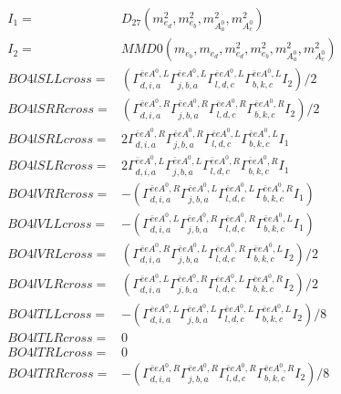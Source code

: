 \documentclass[A4,landscape]{article}
\begin{document}
\begin{align} 
I_1 = & D_{27}(m^2_{e_{{d}}}, m^2_{e_{{b}}}, m^2_{A^0_{{a}}}, m^2_{A^0_{{c}}}) \\ 
I_2 = & MMD0(m_{e_{{b}}}, m_{e_{{d}}}, m^2_{e_{{d}}}, m^2_{e_{{b}}}, m^2_{A^0_{{a}}}, m^2_{A^0_{{c}}}) \\ 
  BO4lSLLcross= & ( \Gamma^{\bar{e}e A^0 ,L}_{d, i, a} \Gamma^{\bar{e}e A^0 ,L}_{j, b, a} \Gamma^{\bar{e}e A^0 ,L}_{l, d, c} \Gamma^{\bar{e}e A^0 ,L}_{b, k, c} I_2)/2 \\ 
  BO4lSRRcross= & ( \Gamma^{\bar{e}e A^0 ,R}_{d, i, a} \Gamma^{\bar{e}e A^0 ,R}_{j, b, a} \Gamma^{\bar{e}e A^0 ,R}_{l, d, c} \Gamma^{\bar{e}e A^0 ,R}_{b, k, c} I_2)/2 \\ 
  BO4lSRLcross= & 2  \Gamma^{\bar{e}e A^0 ,R}_{d, i, a} \Gamma^{\bar{e}e A^0 ,R}_{j, b, a} \Gamma^{\bar{e}e A^0 ,L}_{l, d, c} \Gamma^{\bar{e}e A^0 ,L}_{b, k, c} I_1 \\ 
  BO4lSLRcross= & 2  \Gamma^{\bar{e}e A^0 ,L}_{d, i, a} \Gamma^{\bar{e}e A^0 ,L}_{j, b, a} \Gamma^{\bar{e}e A^0 ,R}_{l, d, c} \Gamma^{\bar{e}e A^0 ,R}_{b, k, c} I_1 \\ 
  BO4lVRRcross= & -( \Gamma^{\bar{e}e A^0 ,R}_{d, i, a} \Gamma^{\bar{e}e A^0 ,L}_{j, b, a} \Gamma^{\bar{e}e A^0 ,L}_{l, d, c} \Gamma^{\bar{e}e A^0 ,R}_{b, k, c} I_1) \\ 
  BO4lVLLcross= & -( \Gamma^{\bar{e}e A^0 ,L}_{d, i, a} \Gamma^{\bar{e}e A^0 ,R}_{j, b, a} \Gamma^{\bar{e}e A^0 ,R}_{l, d, c} \Gamma^{\bar{e}e A^0 ,L}_{b, k, c} I_1) \\ 
  BO4lVRLcross= & ( \Gamma^{\bar{e}e A^0 ,R}_{d, i, a} \Gamma^{\bar{e}e A^0 ,L}_{j, b, a} \Gamma^{\bar{e}e A^0 ,R}_{l, d, c} \Gamma^{\bar{e}e A^0 ,L}_{b, k, c} I_2)/2 \\ 
  BO4lVLRcross= & ( \Gamma^{\bar{e}e A^0 ,L}_{d, i, a} \Gamma^{\bar{e}e A^0 ,R}_{j, b, a} \Gamma^{\bar{e}e A^0 ,L}_{l, d, c} \Gamma^{\bar{e}e A^0 ,R}_{b, k, c} I_2)/2 \\ 
  BO4lTLLcross= & -( \Gamma^{\bar{e}e A^0 ,L}_{d, i, a} \Gamma^{\bar{e}e A^0 ,L}_{j, b, a} \Gamma^{\bar{e}e A^0 ,L}_{l, d, c} \Gamma^{\bar{e}e A^0 ,L}_{b, k, c} I_2)/8 \\ 
  BO4lTLRcross= & 0 \\ 
  BO4lTRLcross= & 0 \\ 
  BO4lTRRcross= & -( \Gamma^{\bar{e}e A^0 ,R}_{d, i, a} \Gamma^{\bar{e}e A^0 ,R}_{j, b, a} \Gamma^{\bar{e}e A^0 ,R}_{l, d, c} \Gamma^{\bar{e}e A^0 ,R}_{b, k, c} I_2)/8 \\ 
\end{align} 
\end{document}
